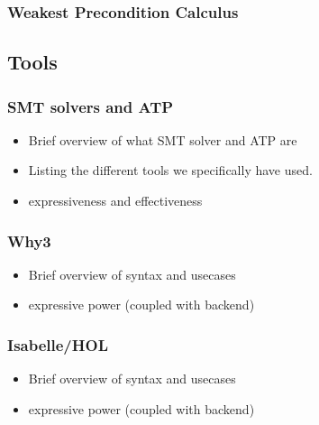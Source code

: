 \subsubsection{Weakest Precondition Calculus}\label{sec:wp}


\subsection{Tools}

\subsubsection{SMT solvers and ATP}
\begin{itemize}
  \item Brief overview of what SMT solver and ATP are
  \item Listing the different tools we specifically have used.
  \item expressiveness and effectiveness
\end{itemize}

\subsubsection{Why3}\label{sec:why3}
\begin{itemize}
  \item Brief overview of syntax and usecases
  \item expressive power (coupled with backend)
\end{itemize}

\subsubsection{Isabelle/HOL}\label{sec:isabelle}
\begin{itemize}
  \item Brief overview of syntax and usecases
  \item expressive power (coupled with backend)
\end{itemize}
